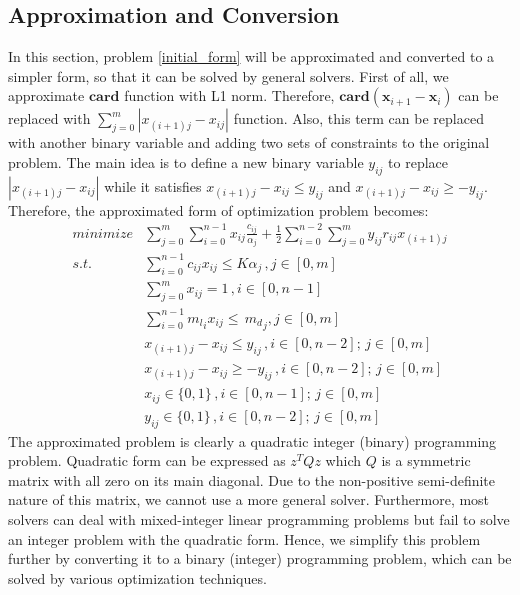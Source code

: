 \documentclass[lettersize,journal]{IEEEtran}
\begin{document}
\subsection{Approximation and Conversion}
In this section, problem \ref{initial_form} will be approximated and converted to a simpler form, so that it can be solved by general solvers. First of all, we approximate $\mathrm{\textbf{card}}$ function with L1 norm. Therefore, $\mathrm{\textbf{card}}(\boldsymbol{x}_{i+1}-\boldsymbol{x}_i)$ can be replaced with $\sum_{j=0}^{m} |x_{(i+1)j}-x_{ij}|$ function. Also, this term can be replaced with another binary variable and adding two sets of constraints to the original problem. The main idea is to define a new binary variable $y_{ij}$ to replace $|x_{(i+1)j}-x_{ij}|$ while it satisfies $x_{(i+1)j}-x_{ij} \leq y_{ij}$ and $x_{(i+1)j}-x_{ij} \geq -y_{ij}$. Therefore, the approximated form of optimization problem becomes:
\begin{align}
minimize &\sum_{j=0}^{m}\sum_{i=0}^{n-1} x_{ij}\frac{c_{ij}}{\alpha_j} + \frac{1}{2}\sum_{i=0}^{n-2} \sum_{j=0}^{m} y_{ij} r_{ij} x_{(i+1)j} \\
s.t. \quad & \sum_{i=0}^{n-1} c_{ij} x_{ij} \leq K \alpha_j \, , j \in [0, m] \nonumber \\
\quad & \sum_{j=0}^{m} x_{ij} = 1 \, , i \in [0, n-1] \nonumber \\
\quad & \sum_{i=0}^{n-1} {m_l}_i x_{ij} \leq \, {m_d}_j  , j \in [0, m] \nonumber \\
\quad & x_{(i+1)j}-x_{ij} \leq y_{ij} \, , i \in [0, n-2]; \, j \in [0,m]  \nonumber \\
\quad & x_{(i+1)j}-x_{ij} \geq -y_{ij} \, , i \in [0, n-2]; \, j \in[0,m]  \nonumber \\
\quad & x_{ij} \in \{0,1\} \, , i \in [0, n-1]; \, j \in [0,m] \nonumber \\
\quad & y_{ij} \in \{0,1\} \, , i \in [0, n-2]; \, j \in [0,m] \nonumber
\end{align}
The approximated problem is clearly a quadratic integer (binary) programming problem. Quadratic form can be expressed as $z^TQz$ which $Q$ is a symmetric matrix with all zero on its main diagonal. Due to the non-positive semi-definite nature of this matrix, we cannot use a more general solver. Furthermore, most solvers can deal with mixed-integer linear programming problems but fail to solve an integer problem with the quadratic form. Hence, we simplify this problem further by converting it to a binary (integer) programming problem, which can be solved by various optimization techniques. 
\end{document}
